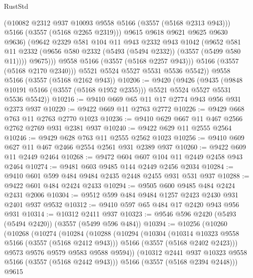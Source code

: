 \begin{lexlean}{RustStd}
\begin{coremodule}
                    (@10082 @2312 @937 @10093 @9558 @5166 (@3557 (@5168 @2313 @943)))
                    @5166
                    (@3557 (@5168 @2265 @2319)))
                  @9615
                  @9618
                  @9621
                  @9625
                  @9630
                  @9636)
                (@9642
                  @2329
                  @581
                  @104
                  @11
                  @943
                  @2332
                  @943
                  @1042
                  (@9652
                    @581
                    @11
                    @2332
                    (@9656 @580 @2332 (@5493 (@5494 @2332)) (@3557 (@5499 @580 @11))))
                  @9675)))
            @9558
            @5166
            (@3557 (@5168 @2257 @943)))
          @5166
          (@3557 (@5168 @2170 @2340)))
        @5521
        @5524
        @5527
        @5531
        @5536
        @5542))
    @9558
    @5166
    (@3557 (@5168 @2162 @943))
@10206 := @9420
    (@9426
      (@9435 (@9848 @10191 @5166 (@3557 (@5168 @1952 @2355))) @5521 @5524 @5527 @5531 @5536 @5542))
@10216 := @9410 @669 @65 @11 @17 @2774 @943 @956 @931 @2373 @937
@10220 := @9422 @669 @11 @2763 @2772
@10226 := @9429 @668 @763 @11 @2763 @2770 @1023
@10236 := @9410 @629 @667 @11 @467 @2566 @2762 @2769 @931 @2381 @937
@10240 := @9422 @629 @11 @2555 @2564
@10246 := @9429 @628 @763 @11 @2555 @2562 @1023
@10256 := @9410 @609 @627 @11 @467 @2466 @2554 @2561 @931 @2389 @937
@10260 := @9422 @609 @11 @2449 @2464
@10268 := @9472 @604 @607 @104 @11 @2449 @2458 @943 @2464
@10274 := @9481 @603 @9485 @144 @2449 @2456 @2034
@10284 := @9410 @601 @599 @484 @9484 @2435 @2448 @2455 @931 @531 @937
@10288 := @9422 @601 @484 @2424 @2433
@10294 := @9505 @600 @9485 @484 @2424 @2431 @2006
@10304 := @9512 @599 @484 @9484 @1257 @2423 @2430 @931 @2401 @937 @9532
@10312 := @9410 @597 @65 @484 @17 @2420 @943 @956 @931
@10314 := @10312 @2411 @937
@10323 := @9546 @596 @2420 (@5493 (@5494 @2420)) (@3557 (@5499 @596 @484))
@10394 := @10256
    (@10260
      (@10268
        (@10274
          (@10284
            (@10288
              (@10294
                (@10304
                  (@10314 @10323 @9558 @5166 (@3557 (@5168 @2412 @943)))
                  @5166
                  (@3557 (@5168 @2402 @2423)))
                @9573
                @9576
                @9579
                @9583
                @9588
                @9594))
            (@10312 @2441 @937 @10323 @9558 @5166 (@3557 (@5168 @2442 @943)))
            @5166
            (@3557 (@5168 @2394 @2448)))
          @9615

\end{coremodule}
\end{lexlean}
